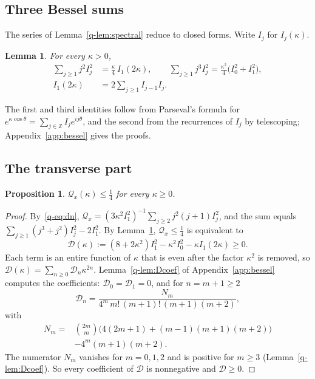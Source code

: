 \documentclass[aps,prd,twocolumn,superscriptaddress,nofootinbib,longbibliography,floatfix,amsmath,amssymb,10pt]{revtex4-2}
\newtheorem{lemma}[theorem]{Lemma}
\newtheorem{proposition}[theorem]{Proposition}
\theoremstyle{definition}
\theoremstyle{remark}
\newcommand{\Z}{\mathbb{Z}}
\begin{document}
\subsection{Three Bessel sums}

The series of Lemma~\ref{q-lem:spectral} reduce to closed forms. Write $I_j$
for $I_j(\kappa)$.

\begin{lemma}\label{q-lem:besselsums}
For every $\kappa>0$,
\begin{align*}
\sum_{j\ge1}j^2I_j^2&=\frac\kappa4\,I_1(2\kappa),\qquad
\sum_{j\ge1}j^3I_j^2=\frac{\kappa^2}4\bigl(I_0^2+I_1^2\bigr),\\
I_1(2\kappa)&=2\sum_{j\ge1}I_{j-1}I_j .
\end{align*}
\end{lemma}

The first and third identities follow from Parseval's formula for
$e^{\kappa\cos\theta}=\sum_{j\in\Z}I_je^{ij\theta}$, and the second from the
recurrences of $I_j$ by telescoping; Appendix~\ref{app:bessel} gives the
proofs.

\subsection{The transverse part}

\begin{proposition}\label{q-prop:transverse}
$\mathcal Q_x(\kappa)\le\frac14$ for every $\kappa\ge0$.
\end{proposition}

\begin{proof}
By~\eqref{q-eq:dn}, $\mathcal Q_x=(3\kappa^2I_1^2)^{-1}\sum_{j\ge2}j^2(j+1)
I_j^2$, and the sum equals $\sum_{j\ge1}(j^3+j^2)I_j^2-2I_1^2$. By
Lemma~\ref{q-lem:besselsums}, $\mathcal Q_x\le\frac14$ is equivalent to
\begin{equation}\label{q-eq:Dfunction}
\mathcal D(\kappa):=(8+2\kappa^2)I_1^2-\kappa^2I_0^2-\kappa I_1(2\kappa)\ge0 .
\end{equation}
Each term is an entire function of $\kappa$ that is even after the
factor $\kappa^2$ is removed, so $\mathcal D(\kappa)=\sum_{n\ge0}\mathcal D_n
\kappa^{2n}$. Lemma~\ref{q-lem:Dcoef} of Appendix~\ref{app:bessel} computes the
coefficients: $\mathcal D_0=\mathcal D_1=0$, and for $n=m+1\ge2$
\[
\mathcal D_n=\frac{N_m}{4^m\,m!\,(m+1)!\,(m+1)(m+2)},
\]
with
\[
\begin{aligned}
N_m={}&\binom{2m}m\bigl(4(2m+1)+(m-1)(m+1)(m+2)\bigr)\\
&-4^m(m+1)(m+2).
\end{aligned}
\]
The numerator $N_m$ vanishes for $m=0,1,2$ and is positive for $m\ge3$
(Lemma~\ref{q-lem:Dcoef}). So every coefficient of $\mathcal D$ is nonnegative
and $\mathcal D\ge0$.
\end{proof}
\end{document}
